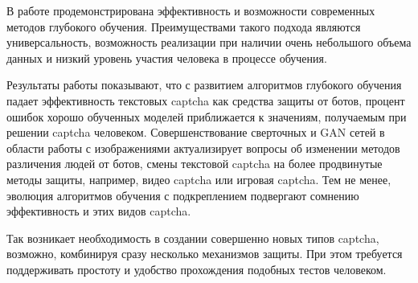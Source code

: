 В работе продемонстрирована эффективность и возможности современных методов глубокого обучения. Преимуществами такого подхода являются универсальность, возможность реализации при наличии очень небольшого объема данных и низкий уровень участия человека в процессе обучения.

Результаты работы показывают, что с развитием алгоритмов глубокого обучения падает эффективность текстовых captcha как средства защиты от ботов, процент ошибок хорошо обученных моделей приближается к значениям, получаемым при решении captcha человеком. Совершенствование сверточных и GAN сетей в области работы с изображениями актуализирует вопросы об изменении методов различения людей от ботов, смены текстовой captcha на более продвинутые методы защиты, например, видео captcha\cite{video-captcha} или игровая captcha\cite{prev-research-4}. Тем не менее, эволюция алгоритмов обучения с подкреплением подвергают сомнению эффективность и этих видов captcha.

Так возникает необходимость в создании совершенно новых типов captcha, возможно, комбинируя сразу несколько механизмов защиты. При этом требуется поддерживать простоту и удобство прохождения подобных тестов человеком.